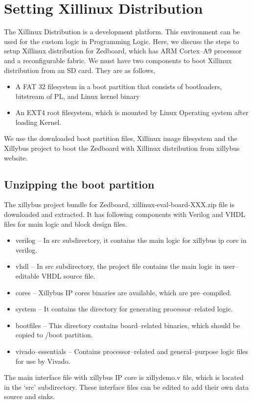 \section{Setting Xillinux Distribution}
The Xillinux Distribution is a development platform. This environment can be used for the custom logic in Programming Logic. Here, we discuss the steps to setup Xillinux distribution for Zedboard, which has ARM Cortex--A9 processor and a reconfigurable fabric. We must have two components to boot Xillinux distribution from an SD card. They are as follows,
\begin{itemize}\itemsep0em 
\item A FAT 32 filesystem in a boot partition that consists of bootloaders, bitstream of PL, and Linux kernel binary
\item An EXT4 root filesystem, which is mounted by Linux Operating system after loading Kernel.
\end{itemize}
We use the downloaded boot partition files, Xillinux image filesystem and the Xillybus project to boot the Zedboard with Xillinux distribution from xillybus website. 

\subsection{Unzipping the boot partition}
The xillybus project bundle for Zedboard, xillinux-eval-board-XXX.zip file is downloaded and extracted. It has following components with Verilog and VHDL files for main logic and block design files.
\begin{itemize}\itemsep0em 
\item verilog -- In src subdirectory, it contains the main logic for xillybus ip core in verilog.
\item vhdl -- In src subdirectory, the project file contains the main logic in user--editable VHDL source file.
\item cores -- Xillybus IP cores binaries are available, which are pre--compiled.
\item system -- It contains the directory for generating processor--related logic.
\item bootfiles -- This directory contains board--related binaries, which should be copied to /boot partition.
\item vivado--essentials – Contains processor--related and general--purpose logic files for use by Vivado.
\end{itemize}
The main interface file with xillybus IP core is xillydemo.v file, which is located in the ‘src’ subdirectory. These interface files can be edited to add their own data source and sinks. 

